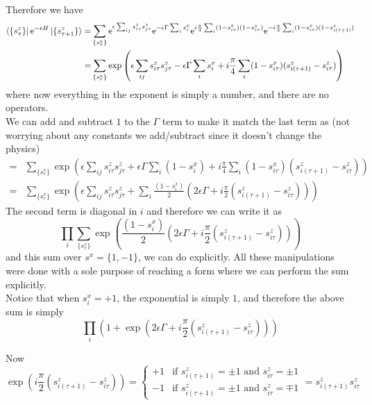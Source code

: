 \documentclass[11pt]{article}
\newcommand{\e}{\mathrm{e}}
\numberwithin{equation}{section}
\begin{document}
Therefore we have 
\begin{align*}
    \bra{\{s_\tau^z\}} \e^{-\epsilon H} \ket{\{s_{\tau+1}^z\}} =& \sum_{\{s_\tau^x\}} \e^{\epsilon \sum_{ij} s^z_{i\tau}s^z_{j\tau}} \e^{-\epsilon \Gamma\sum_i s^x_i}  \e^{i\frac{\pi}{4}\sum_i (1-s_{i\tau}^x)(1-s_{i\tau}^z)} \e^{-i\frac{\pi}{4}\sum_i (1-s_{i\tau}^x)(1-s_{i(\tau+1)}^z)} \\
    =& \sum_{\{s_\tau^x\}} \exp\left(\epsilon \sum_{ij} s^z_{i\tau}s^z_{j\tau}-\epsilon \Gamma\sum_i s^x_i + i\frac{\pi}{4}\sum_i (1-s_{i\tau}^x)(s_{i(\tau+1)}^z-s_{i\tau}^z)\right) 
\end{align*}
where now everything in the exponent is simply a number, and there are no operators.\\
We can add and subtract \(1\) to the \(\Gamma\) term to make it match the last term as (not worrying about any constants we add/subtract since it doesn't change the physics)
\begin{align*}
    =&\sum_{\{s_\tau^x\}} \exp\left(\epsilon \sum_{ij} s^z_{i\tau}s^z_{j\tau}+\epsilon \Gamma\sum_i (1-s^x_i) + i\frac{\pi}{4}\sum_i (1-s_{i\tau}^x)(s_{i(\tau+1)}^z-s_{i\tau}^z)\right) \\
    =&\sum_{\{s_\tau^x\}} \exp\left(\epsilon \sum_{ij} s^z_{i\tau}s^z_{j\tau}+\sum_i \frac{(1-s^x_i)}{2} \left(2\epsilon \Gamma + i\frac{\pi}{2}(s_{i(\tau+1)}^z-s_{i\tau}^z)\right)\right) 
\end{align*}
The second term is diagonal in \(i\) and therefore we can write it as 
\begin{equation*}
    \prod_i \sum_{\{s_\tau^x\}} \exp\left(\frac{(1-s^x_i)}{2} \left(2\epsilon \Gamma + i\frac{\pi}{2}(s_{i(\tau+1)}^z-s_{i\tau}^z)\right)\right)
\end{equation*}
and this sum over \(s^x = \{1,-1\}\), we can do explicitly. All these manipulations were done with a sole purpose of reaching a form where we can perform the sum explicitly.\\

Notice that when \(s^x_i = +1\), the exponential is simply \(1\), and therefore the above sum is simply 
\begin{equation*}
    \prod_i \left(1 +  \exp\left(2\epsilon \Gamma + i\frac{\pi}{2}(s_{i(\tau+1)}^z-s_{i\tau}^z)\right) \right)
\end{equation*}

Now 
\begin{equation*}
    \exp\left( i\frac{\pi}{2}(s_{i(\tau+1)}^z - s_{i\tau}^z) \right) = 
    \begin{cases}
        +1 & \text{if } s_{i(\tau+1)}^z = \pm 1 \text{ and } s_{i\tau}^z = \pm 1 \\
        -1 & \text{if } s_{i(\tau+1)}^z = \pm 1 \text{ and } s_{i\tau}^z = \mp 1
    \end{cases}
    = s_{i(\tau+1)}^z s_{i\tau}^z
\end{equation*}
\end{document}
